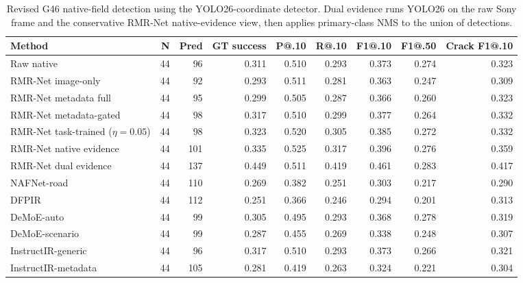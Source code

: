\begin{table}[!t]
\centering
\caption{Revised G46 native-field detection using the YOLO26-coordinate detector. Dual evidence runs YOLO26 on the raw Sony frame and the conservative RMR-Net native-evidence view, then applies primary-class NMS to the union of detections.}
\label{tab:g46_dual_evidence}
\scriptsize
\setlength{\tabcolsep}{3.5pt}
\begin{tabular}{lrrrrrrrr}
\toprule
Method & N & Pred & GT success & P@.10 & R@.10 & F1@.10 & F1@.50 & Crack F1@.10 \\
\midrule
Raw native & 44 & 96 & 0.311 & 0.510 & 0.293 & 0.373 & 0.274 & 0.323 \\
RMR-Net image-only & 44 & 92 & 0.293 & 0.511 & 0.281 & 0.363 & 0.247 & 0.309 \\
RMR-Net metadata full & 44 & 95 & 0.299 & 0.505 & 0.287 & 0.366 & 0.260 & 0.323 \\
RMR-Net metadata-gated & 44 & 98 & 0.317 & 0.510 & 0.299 & 0.377 & 0.264 & 0.332 \\
RMR-Net task-trained ($\eta=0.05$) & 44 & 98 & 0.323 & 0.520 & 0.305 & 0.385 & 0.272 & 0.332 \\
RMR-Net native evidence & 44 & 101 & 0.335 & 0.525 & 0.317 & 0.396 & 0.276 & 0.359 \\
RMR-Net dual evidence & 44 & 137 & 0.449 & 0.511 & 0.419 & 0.461 & 0.283 & 0.417 \\
NAFNet-road & 44 & 110 & 0.269 & 0.382 & 0.251 & 0.303 & 0.217 & 0.290 \\
DFPIR & 44 & 112 & 0.251 & 0.366 & 0.246 & 0.294 & 0.201 & 0.313 \\
DeMoE-auto & 44 & 99 & 0.305 & 0.495 & 0.293 & 0.368 & 0.278 & 0.319 \\
DeMoE-scenario & 44 & 99 & 0.287 & 0.455 & 0.269 & 0.338 & 0.248 & 0.307 \\
InstructIR-generic & 44 & 96 & 0.317 & 0.510 & 0.293 & 0.373 & 0.266 & 0.321 \\
InstructIR-metadata & 44 & 105 & 0.281 & 0.419 & 0.263 & 0.324 & 0.221 & 0.304 \\
\bottomrule
\end{tabular}
\end{table}
